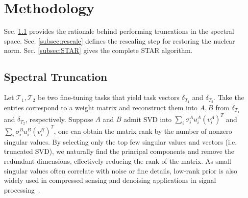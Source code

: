 
\section{Methodology}\label{sec:spectral_truncate}
Sec. \ref{subsec:truncate} provides the rationale behind performing truncations in the spectral space. Sec. \ref{subsec:rescale} defines the rescaling step for restoring the nuclear norm. Sec. \ref{subsec:STAR} gives the complete STAR algorithm.


\subsection{Spectral Truncation}
\label{subsec:truncate}
Let $\mathcal{T}_1,\mathcal{T}_2$ be two fine-tuning tasks that yield task vectors $\delta_{T_1}$ and $\delta_{T_2}$. Take the entries correspond to a weight matrix and reconstruct them into $A,B$ from $\delta_{T_1}$ and $\delta_{T_2}$, respectively. Suppose $A$ and $B$ admit SVD into $\sum_i\sigma_i^A u_i^A (v_i^A)^T$ and $\sum_i\sigma_i^B u_i^B (v_i^B)^T$, one can obtain the matrix rank by the number of nonzero singular values. By selecting only the top few singular values and vectors (i.e. truncated SVD), we naturally find the principal components and remove the redundant dimensions, effectively reducing the rank of the matrix. As small singular values often correlate with noise or fine details, low-rank prior is also widely used in compressed sensing and denoising applications in signal processing~\cite{dabov2007image,candes2010matrix,cai2010singular,candes2012exact}.




